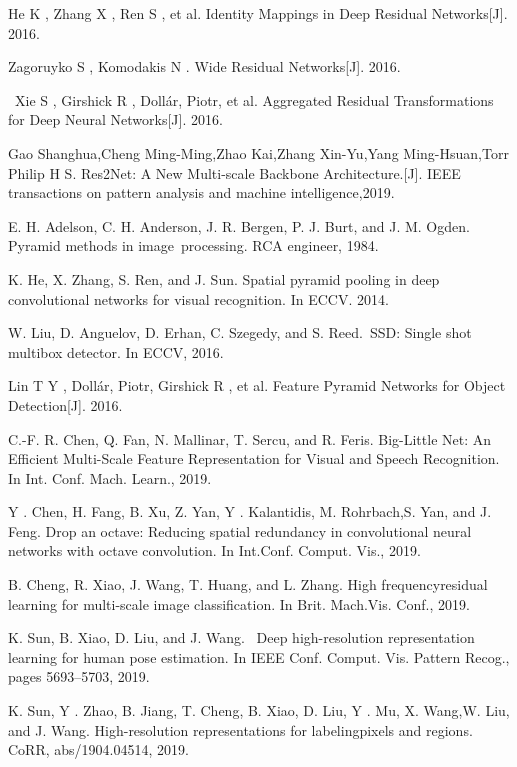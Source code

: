 \documentclass[15pt]{article}
\begin{document}
\begin{thebibliography}{99}
 He K , Zhang X , Ren S , et al. Identity Mappings in Deep Residual Networks[J]. 2016.

 Zagoruyko S , Komodakis N . Wide Residual Networks[J]. 2016.

 Xie S , Girshick R , Dollár, Piotr, et al. Aggregated Residual Transformations for Deep Neural Networks[J]. 2016.

 Gao Shanghua,Cheng Ming-Ming,Zhao Kai,Zhang Xin-Yu,Yang Ming-Hsuan,Torr Philip H S. Res2Net: A New Multi-scale Backbone Architecture.[J]. IEEE transactions on pattern analysis and machine intelligence,2019.

 E. H. Adelson, C. H. Anderson, J. R. Bergen, P. J. Burt, and J. M. Ogden. Pyramid methods in image processing. RCA engineer, 1984.

 K. He, X. Zhang, S. Ren, and J. Sun. Spatial pyramid pooling in deep convolutional networks for visual recognition. In ECCV. 2014.

 W. Liu, D. Anguelov, D. Erhan, C. Szegedy, and S. Reed. SSD: Single shot multibox detector. In ECCV, 2016.

 Lin T Y , Dollár, Piotr, Girshick R , et al. Feature Pyramid Networks for Object Detection[J]. 2016.

 C.-F. R. Chen, Q. Fan, N. Mallinar, T. Sercu, and R. Feris. Big-Little Net: An Efficient Multi-Scale Feature Representation for Visual and Speech Recognition. In Int. Conf. Mach. Learn., 2019.

 Y . Chen, H. Fang, B. Xu, Z. Yan, Y . Kalantidis, M. Rohrbach,S. Yan, and J. Feng. Drop an octave: Reducing spatial redundancy in convolutional neural networks with octave convolution. In Int.Conf. Comput. Vis., 2019.

 B. Cheng, R. Xiao, J. Wang, T. Huang, and L. Zhang. High frequencyresidual learning for multi-scale image classification. In Brit. Mach.Vis. Conf., 2019.

 K. Sun, B. Xiao, D. Liu, and J. Wang.  Deep high-resolution representation learning for human pose estimation. In IEEE Conf. Comput. Vis. Pattern Recog., pages 5693–5703, 2019.

 K. Sun, Y . Zhao, B. Jiang, T. Cheng, B. Xiao, D. Liu, Y . Mu, X. Wang,W. Liu, and J. Wang. High-resolution representations for labelingpixels and regions. CoRR, abs/1904.04514, 2019.


\end{thebibliography}
\end{document}
